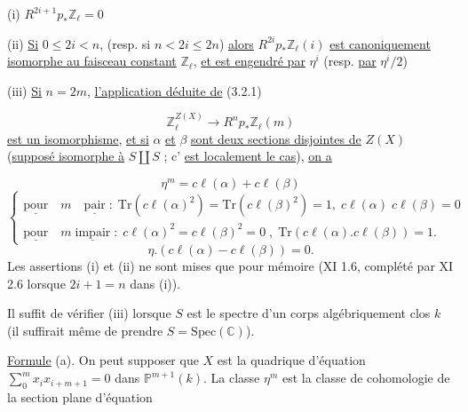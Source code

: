(i) \quad $R^{2i+1} p_* \mathbb{Z}_\ell = 0$ 



(ii) \underline{Si} $0 \leqslant 2i < n$, (resp. si $n< 2i \leqslant 2n$) \underline{alors} $R^{2i}p_{*} \mathbb{Z}_{\ell}(i)$ \underline{est canoniquement isomorphe au faisceau constant} $\mathbb{Z}_{\ell}$, \underline{et est engendré par} $\eta^{i}$ (resp. \underline{par} $\eta^{i}/2$)

(iii) \underline{Si} $n = 2m$, \underline{l'application déduite de} (3.2.1)

\begin{equation}\tag{3.2.1}
\mathbb{Z}_{\ell}^{Z(X)} \longrightarrow R^{n}p_{*} \mathbb{Z}_{\ell}(m)
\end{equation}
\underline{est un isomorphisme}, \underline{et si} $\alpha$ \underline{et} $\beta$ \underline{sont deux sections disjointes de} $Z(X)$ (\underline{supposé isomorphe à} $S \amalg S$ ; c' \underline{est localement le cas}), \underline{on a}

\begin{equation*}\tag{a}
\eta^{m} = c\ell(\alpha) + c\ell(\beta)
\end{equation*}
\begin{equation*}\tag{b}
\left\{ \begin{array}{l} \underline{\mathrm{pour}} \quad m \quad \underline{\mathrm{pair}} \; : \; \mathrm{Tr}(c\ell(\alpha)^{2}) = \mathrm{Tr}(c\ell(\beta)^{2}) = 1, \; c\ell(\alpha) \; c\ell(\beta) = 0 \\[2ex] \underline{\mathrm{pour}} \quad m \; \underline{\mathrm{impair}} \; : \; c\ell(\alpha)^{2} = c\ell(\beta)^{2} = 0 \; , \; \mathrm{Tr}(c\ell(\alpha).c\ell(\beta)) = 1. \end{array} \right.
\end{equation*}
\begin{equation*}\tag{c}
\eta.(c\ell(\alpha) - c\ell(\beta)) = 0.
\end{equation*}
Les assertions (i) et (ii) ne sont mises que pour mémoire (XI 1.6, complété par XI 2.6 lorsque $2i + 1 = n$ dans (i)).

Il suffit de vérifier (iii) lorsque $S$ est le spectre d'un corps algébriquement clos $k$ (il suffirait même de prendre $S = \mathrm{Spec}(\mathbb{C})$).

\underline{Formule} (a). On peut supposer que $X$ est la quadrique d'équation $\sum\limits_{0}^{m} x_{i}x_{i+m+1} = 0$ dans $\mathbb{P}^{m+1}(k)$. La classe $\eta^{m}$ est la classe de cohomologie de la section plane d'équation

